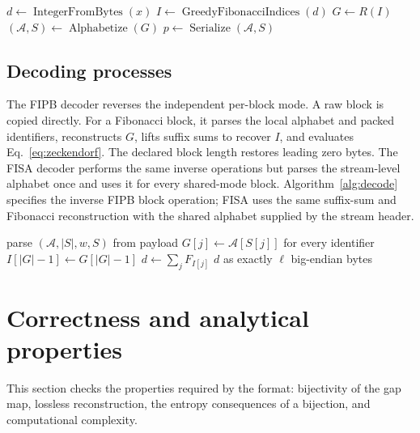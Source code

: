 \documentclass[a4paper,fleqn]{cas-dc}
\begin{document}
\begin{algorithm}[t]
\caption{Hybrid FIPB encoding of one independent block}
\label{alg:encode}
$d\leftarrow\operatorname{IntegerFromBytes}(x)$\;
$I\leftarrow\operatorname{GreedyFibonacciIndices}(d)$\;
$G\leftarrow R(I)$\;
$(\mathcal{A},S)\leftarrow\operatorname{Alphabetize}(G)$\;
$p\leftarrow\operatorname{Serialize}(\mathcal{A},S)$\;
\end{algorithm}

\subsection{Decoding processes}

The FIPB decoder reverses the independent per-block mode. A raw block is
copied directly. For a Fibonacci block, it parses the local alphabet and
packed identifiers, reconstructs $G$, lifts suffix sums to recover $I$, and
evaluates Eq.~\eqref{eq:zeckendorf}. The declared block length restores
leading zero bytes. The FISA decoder performs the same inverse operations but
parses the stream-level alphabet once and uses it for every shared-mode block.
Algorithm~\ref{alg:decode} specifies the inverse FIPB block operation; FISA
uses the same suffix-sum and Fibonacci reconstruction with the shared
alphabet supplied by the stream header.

\begin{algorithm}[t]
\caption{\texttt{DecodeFIPBBlock(mode,payload,$\ell$)}}
\label{alg:decode}
parse $(\mathcal{A},|S|,w,S)$ from payload\;
$G[j]\leftarrow\mathcal{A}[S[j]]$ for every identifier\;
$I[|G|-1]\leftarrow G[|G|-1]$\;
$d\leftarrow\sum_j F_{I[j]}$\;
\Return $d$ as exactly $\ell$ big-endian bytes\;
\end{algorithm}

\section{Correctness and analytical properties}
\label{sec:analysis}

This section checks the properties required by the format: bijectivity of the
gap map, lossless reconstruction, the entropy consequences of a bijection,
and computational complexity.
\end{document}
